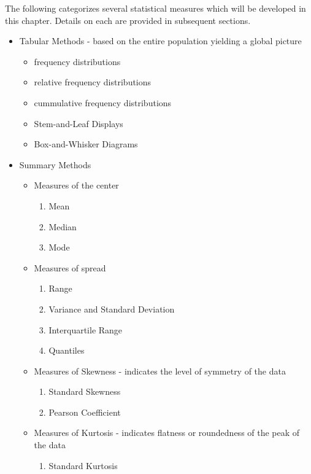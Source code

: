 \documentclass[10pt,]{book}
\theoremstyle{plain}
\theoremstyle{definition}
\theoremstyle{definition}
\theoremstyle{definition}
\numberwithin{equation}{section}
\begin{document}
The following categorizes several statistical measures which will be developed in this chapter. Details on each are provided in subsequent sections.
%
\leavevmode%
\begin{itemize}[label=\textbullet]
\item{}Tabular Methods - 
	based on the entire population yielding a global picture%
%
\begin{itemize}[label=$\circ$]
\item{}frequency distributions%
\item{}relative frequency distributions%
\item{}cummulative frequency distributions%
\item{}Stem-and-Leaf Displays%
\item{}Box-and-Whisker Diagrams%
\end{itemize}
\item{}Summary Methods%
%
\begin{itemize}[label=$\circ$]
\item{}Measures of the center%
%
\begin{enumerate}
\item\hypertarget{li-13}{}Mean%
\item\hypertarget{li-14}{}Median%
\item\hypertarget{li-15}{}Mode%
\end{enumerate}
\item{}Measures of spread%
%
\begin{enumerate}
\item\hypertarget{li-17}{}Range%
\item\hypertarget{li-18}{}Variance and Standard Deviation%
\item\hypertarget{li-19}{}Interquartile Range%
\item\hypertarget{li-20}{}Quantiles%
\end{enumerate}
\item{}Measures of Skewness
			- indicates the level of symmetry of the data%
%
\begin{enumerate}
\item\hypertarget{li-22}{}Standard Skewness%
\item\hypertarget{li-23}{}Pearson Coefficient%
\end{enumerate}
\item{}Measures of Kurtosis 
			- indicates flatness or roundedness of the peak of the data%
%
\begin{enumerate}
\item\hypertarget{li-25}{}Standard Kurtosis%

\end{enumerate}
\end{itemize}
\end{itemize}
\end{document}
